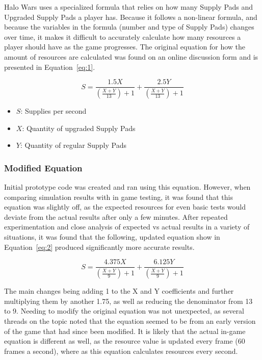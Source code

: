 \documentclass[a4paper, 12pt, english]{article}
\begin{document}
Halo Wars uses a specialized formula that relies on how many Supply Pads and Upgraded Supply Pads a player has. Because it follows a non-linear formula, and because the variables in the formula (number and type of Supply Pads) changes over time, it makes it difficult to accurately calculate how many resources a player should have as the game progresses. The original equation for how the amount of resources are calculated was found on an online discussion form and is presented in Equation~\ref{eq:1}.

\begin{equation}
S = \frac{1.5  X}{\left(\frac{X+Y}{13}\right) + 1} + \frac{2.5 Y}{\left(\frac{X+Y}{13}\right) + 1}
\label{eq:1}
\end{equation}

\begin{itemize}
    \item $S$: Supplies per second
    \item $X$: Quantity of upgraded Supply Pads
    \item $Y$: Quantity of regular Supply Pads
\end{itemize}

\subsubsection{Modified Equation}

Initial prototype code was created and ran using this equation. However, when comparing simulation results with in game testing, it was found that this equation was slightly off, as the expected resources for even basic tests would deviate from the actual results after only a few minutes. After repeated experimentation and close analysis of expected vs actual results in a variety of situations, it was found that the following, updated equation show in Equation~\ref{eq:2} produced significantly more accurate results.
\newline

\begin{equation}
S = \frac{4.375 X}{\left(\frac{X+Y}{9}\right) + 1} + \frac{6.125 Y}{\left(\frac{X+Y}{9}\right) + 1}
\label{eq:2}
\end{equation}
\newline

The main changes being adding 1 to the X and Y coefficients and further multiplying them by another 1.75, as well as reducing the denominator from 13 to 9. Needing to modify the original equation was not unexpected, as several threads on the topic noted that the equation seemed to be from an early version of the game that had since been modified. It is likely that the actual in-game equation is different as well, as the resource value is updated every frame (60 frames a second), where as this equation calculates resources every second. 
\newline
\end{document}
